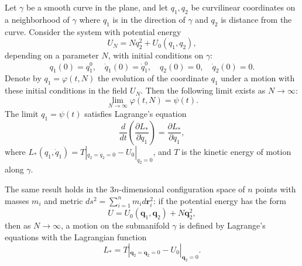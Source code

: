 Let $\gamma$ be a smooth curve in the plane, and let $q_1, q_2$ be curvilinear coordinates on a neighborhood of $\gamma$ where $q_1$ is in the direction of $\gamma$ and $q_2$ is distance from the curve. Consider the system with potential energy
$$U_N = N q_2^2 + U_0(q_1, q_2),$$
depending on a parameter $N$, with initial conditions on $\gamma$:
$$q_1(0) = q_1^0,\quad \dot{q}_1(0) = \dot{q}_1^0,\quad q_2(0) = 0,\quad \dot{q}_2(0) = 0.$$
Denote by $q_1 = \varphi(t, N)$ the evolution of the coordinate $q_1$ under a motion with these initial conditions in the field $U_N$. Then the following limit exists as $N \to \infty$:
$$\lim_{N \to \infty} \varphi(t, N) = \psi(t).$$
The limit $q_1 = \psi(t)$ satisfies Lagrange's equation
$$\frac{d}{dt} \left( \frac{\partial L_*}{\partial \dot{q}_1} \right) = \frac{\partial L_*}{\partial q_1},$$
where $L_*(q_1, \dot{q}_1) = T|_{q_2 = \dot{q}_2 = 0} - U_0|_{q_2 = 0}$, and $T$ is the kinetic energy of motion along $\gamma$.

The same result holds in the $3n$-dimensional configuration space of $n$ points with masses $m_i$ and metric $ds^2 = \sum_{i=1}^{n} m_i d\mathbf{r}_i^2$: if the potential energy has the form
$$U = U_0(\mathbf{q}_1, \mathbf{q}_2) + N \mathbf{q}_2^2,$$
then as $N \to \infty$, a motion on the submanifold $\gamma$ is defined by Lagrange's equations with the Lagrangian function
$$L_* = T|_{\mathbf{q}_2 = \dot{\mathbf{q}}_2 = 0} - U_0|_{\mathbf{q}_2 = 0}.$$
